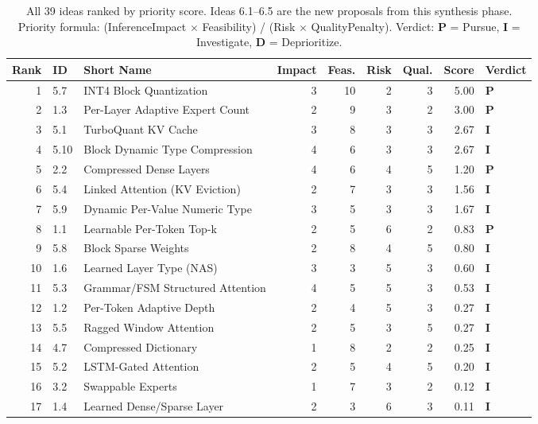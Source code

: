 \documentclass[11pt]{article}
\begin{document}
\begin{table}[h]
\centering
\caption{All 39 ideas ranked by priority score. Ideas 6.1--6.5 are the new proposals from this synthesis phase. Priority formula: (InferenceImpact $\times$ Feasibility) / (Risk $\times$ QualityPenalty). Verdict: \textbf{P} = Pursue, \textbf{I} = Investigate, \textbf{D} = Deprioritize.}
\label{tab:priority_all}
\small
\begin{tabular}{rllrrrrrl}
\hline
\textbf{Rank} & \textbf{ID} & \textbf{Short Name} & \textbf{Impact} & \textbf{Feas.} & \textbf{Risk} & \textbf{Qual.} & \textbf{Score} & \textbf{Verdict} \\
\hline
1 & 5.7 & INT4 Block Quantization & 3 & 10 & 2 & 3 & 5.00 & \textbf{P} \\
2 & 1.3 & Per-Layer Adaptive Expert Count & 2 & 9 & 3 & 2 & 3.00 & \textbf{P} \\
3 & 5.1 & TurboQuant KV Cache & 3 & 8 & 3 & 3 & 2.67 & \textbf{I} \\
4 & 5.10 & Block Dynamic Type Compression & 4 & 6 & 3 & 3 & 2.67 & \textbf{I} \\
5 & 2.2 & Compressed Dense Layers & 4 & 6 & 4 & 5 & 1.20 & \textbf{P} \\
6 & 5.4 & Linked Attention (KV Eviction) & 2 & 7 & 3 & 3 & 1.56 & \textbf{I} \\
7 & 5.9 & Dynamic Per-Value Numeric Type & 3 & 5 & 3 & 3 & 1.67 & \textbf{I} \\
8 & 1.1 & Learnable Per-Token Top-k & 2 & 5 & 6 & 2 & 0.83 & \textbf{P} \\
9 & 5.8 & Block Sparse Weights & 2 & 8 & 4 & 5 & 0.80 & \textbf{I} \\
10 & 1.6 & Learned Layer Type (NAS) & 3 & 3 & 5 & 3 & 0.60 & \textbf{I} \\
11 & 5.3 & Grammar/FSM Structured Attention & 4 & 5 & 5 & 3 & 0.53 & \textbf{I} \\
12 & 1.2 & Per-Token Adaptive Depth & 2 & 4 & 5 & 3 & 0.27 & \textbf{I} \\
13 & 5.5 & Ragged Window Attention & 2 & 5 & 3 & 5 & 0.27 & \textbf{I} \\
14 & 4.7 & Compressed Dictionary & 1 & 8 & 2 & 2 & 0.25 & \textbf{I} \\
15 & 5.2 & LSTM-Gated Attention & 2 & 5 & 4 & 5 & 0.20 & \textbf{I} \\
16 & 3.2 & Swappable Experts & 1 & 7 & 3 & 2 & 0.12 & \textbf{I} \\
17 & 1.4 & Learned Dense/Sparse Layer & 2 & 3 & 6 & 3 & 0.11 & \textbf{I} \\

\end{tabular}
\end{table}
\end{document}
